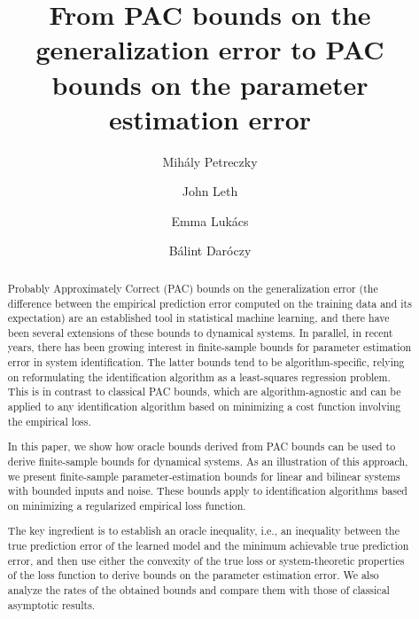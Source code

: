 \documentclass{ifacconf}
\begin{document}
\begin{frontmatter}

\title{ From PAC bounds on the generalization error to PAC bounds on the parameter estimation error}

\author[ULille]{Mih\'aly Petreczky}
\author[AAU]{John Leth}
\author[SZTAKI]{Emma Luk\'acs}
\author[SZTAKI]{B\'alint Dar\'oczy}
\address[AAU]{Department of Electronic Systems, Aalborg University, Denmark (e-mail: jjl@es.aau.dk).}
\address[SZTAKI]{Institute for Computer Science and Control, HUN-REN SZTAKI, Budapest, Hungary (e-mail: \{emma.lukacs, balint.daroczy\}@sztaki.hu).}
\address[ULille]{Univ. Lille, CNRS, Centrale Lille, UMR 9189 CRIStAL, F-59000 Lille, France (e-mail: mihaly.petreczky@centralelille.fr).}

\begin{abstract}
Probably Approximately Correct (PAC) bounds on the generalization error (the difference between the empirical prediction error computed on the training data and its expectation) are an established tool in statistical machine learning, and there have been several extensions of these bounds to dynamical systems. In parallel, in recent years, there has been growing interest in finite-sample bounds for parameter estimation error in system identification. The latter bounds tend to be algorithm-specific, relying on reformulating the identification algorithm as a least-squares regression problem. This is in contrast to classical PAC bounds, which are algorithm-agnostic and can be applied to any identification algorithm based on minimizing a cost function involving the empirical loss.

In this paper, we show how oracle bounds derived from PAC bounds can be used to derive finite-sample bounds for dynamical systems. As an illustration of this approach, we present finite-sample parameter-estimation bounds for linear and bilinear systems with bounded inputs and noise. These bounds apply to identification algorithms based on minimizing a regularized empirical loss function.

The key ingredient is to establish an oracle inequality, i.e., an inequality between the true prediction error of the learned model and the minimum achievable true prediction error, and then use either the convexity of the true loss or system-theoretic properties of the loss function to derive bounds on the parameter estimation error. We also analyze the rates of the obtained bounds and compare them with those of classical asymptotic results.
\end{abstract}

\end{frontmatter}
\end{document}
